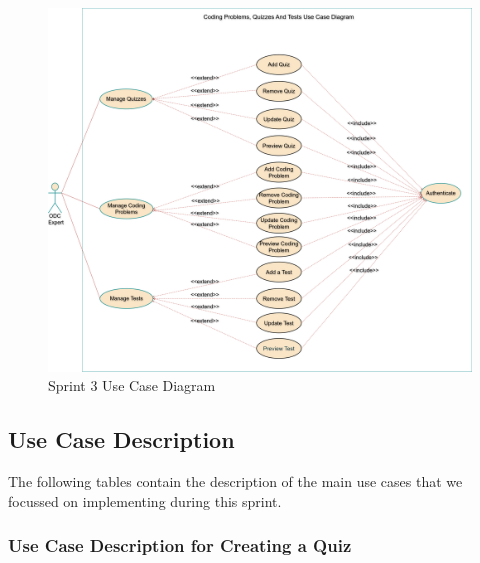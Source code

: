 \begin{figure}
  \centering
  \includegraphics[width=1\textwidth, height=0.9\textheight]{images/usecaseSprint2.png}
  \caption{Sprint 3 Use Case Diagram}\label{fig: Sprint 3 Use Case Diagram}
\end{figure}

\newpage

\subsection{Use Case Description}
The following tables contain the description of the main use cases that we focussed on implementing during this sprint.

\subsubsection{Use Case Description for Creating a Quiz}

